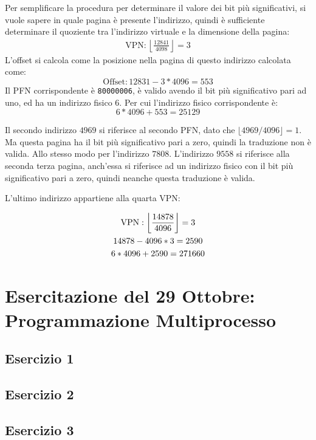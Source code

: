 \documentclass{article}
\numberwithin{equation}{subsection}
\begin{document}
Per semplificare la procedura per determinare il valore dei bit più significativi, si vuole sapere in quale pagina è presente l'indirizzo, quindi è sufficiente determinare 
il quoziente tra l'indirizzo virtuale e la dimensione della pagina:
\begin{gather*}
    \mathrm{VPN}:\left\lfloor\displaystyle\frac{12841}{4098}\right\rfloor=3
\end{gather*}
L'offset si calcola come la posizione nella pagina di questo indirizzo calcolata come:
\begin{equation*}
    \mathrm{Offset}:12831-3*4096=553
\end{equation*}
Il PFN corrispondente è \verb|80000006|, è valido avendo il bit più significativo pari ad uno, ed ha un indirizzo fisico 6. Per cui l'indirizzo fisico corrispondente è:
\begin{equation}
    6*4096+553=25129
\end{equation}

Il secondo indirizzo $4969$ si riferisce al secondo PFN, dato che $\lfloor4969/4096\rfloor=1$. Ma questa pagina ha il bit più significativo pari a zero, quindi la traduzione 
non è valida. Allo stesso modo per l'indirizzo $7808$. L'indirizzo $9558$ si riferisce alla seconda terza pagina, anch'essa si riferisce ad un indirizzo fisico con 
il bit più significativo pari a zero, quindi neanche questa traduzione è valida. 

L'ultimo indirizzo appartiene alla quarta VPN: 

\begin{gather*}
    \mathrm{VPN}:\left\lfloor\displaystyle\frac{14878}{4096}\right\rfloor=3\\
    14878-4096*3=2590\\
    6*4096+2590=27166\theequation
\end{gather*}


\section{Esercitazione del 29 Ottobre: Programmazione Multiprocesso}

\subsection{Esercizio 1}
\subsection{Esercizio 2}
\subsection{Esercizio 3}
\end{document}
